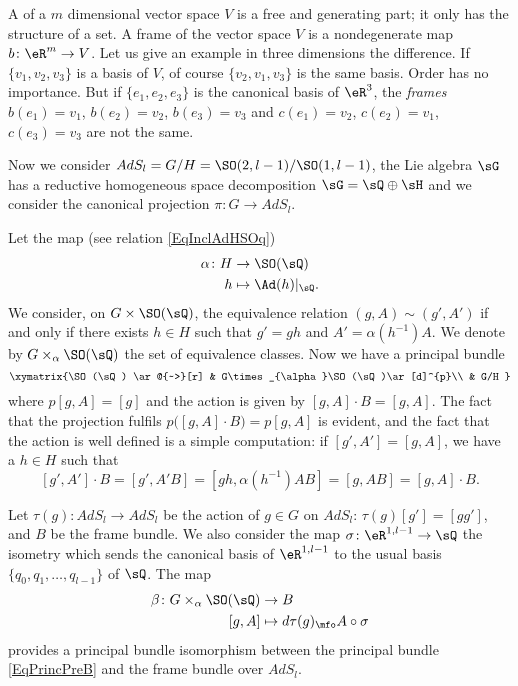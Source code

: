 A  of a $m$ dimensional vector space $V$ is a free and generating part; it only has the structure of a set. A frame of the vector space $V$ is a nondegenerate map $b\colon \eR^{m}\to V$. Let us give an example in three dimensions the difference. If $\{ v_{1},v_{2},v_{3} \}$ is a basis of $V$, of course $\{ v_{2},v_{1},v_{3} \}$ is the same basis. Order has no importance. But if $\{ e_{1},e_{2},e_{3} \}$ is the canonical basis of $\eR^{3}$, the \emph{frames} $b(e_{1})=v_1$, $b(e_{2})=v_2$, $b(e_{3})=v_{3}$ and $c(e_{1})=v_2$, $c(e_{2})=v_1$, $c(e_{3})=v_{3}$ are not the same.

Now we consider $AdS_l=G/H=\SO(2,l-1)/\SO(1,l-1)$, the Lie algebra $\sG$ has a reductive homogeneous space decomposition $\sG=\sQ\oplus\sH$ and we consider the canonical projection $\pi\colon G\to AdS_l$.

Let the map (see relation \eqref{EqInclAdHSOq})
\begin{equation}
\begin{aligned}
 \alpha\colon H&\to \SO(\sQ) \\
h&\mapsto \Ad(h)|_{\sQ}.
\end{aligned}
\end{equation}
We consider, on $G\times\SO(\sQ)$, the equivalence relation $(g,A)\sim(g',A')$ if and only if there exists $h\in H$ such that $g'=gh$ and $A'=\alpha(h^{-1})A$. We denote by $G\times_{\alpha}\SO(\sQ)$ the set of equivalence classes. Now we have a principal bundle
\begin{equation}   \label{EqPrincPreB}
\xymatrix{%
   \SO(\sQ) \ar@{~>}[r]     &   G\times_{\alpha}\SO(\sQ)\ar[d]^{p}\\
                &      G/H
}
\end{equation}
where $p[g,A]=[g]$ and the action is given by $[g,A]\cdot B=[g,A]$. The fact that the projection fulfils $p\big( [g,A]\cdot B \big)=p[g,A]$ is evident, and the fact that the action is well defined is a simple computation:
if $[g',A']=[g,A]$, we have a $h\in H$ such that
\[
  [g',A']\cdot B=[g',A'B]
        =[gh,\alpha(h^{-1})AB]
        =[g,AB]
        =[g,A]\cdot B.
\]

\begin{proposition}
Let $\tau(g)\colon AdS_l\to AdS_l$ be the action of $g\in G$ on $AdS_l$: $\tau(g)[g']=[gg']$, and $B$ be the frame bundle. We also consider the map $\sigma\colon \eR^{1,l-1}\to \sQ$ the isometry which sends the canonical basis of $\eR^{1,l-1}$ to the usual basis $\{ q_0,q_{1},\ldots,q_{l-1} \}$ of $\sQ$. The map
\begin{equation}
\begin{aligned}
 \beta\colon G\times_{\alpha} \SO(\sQ)&\to B \\
[g,A]&\mapsto d\tau(g)_{\mfo}A\circ\sigma
\end{aligned}
\end{equation}
provides a principal bundle isomorphism between the principal bundle  \eqref{EqPrincPreB} and the frame bundle over $AdS_l$.

\end{proposition}

